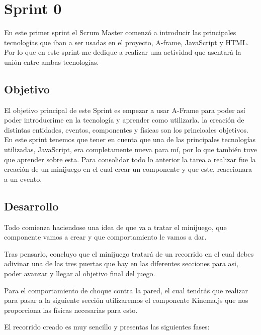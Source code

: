 \documentclass[a4paper, 12pt]{book}
\begin{document}
\section{Sprint 0} %
\label{sec:sprint0}
En este primer sprint el Scrum Master comenzó a introducir las principales tecnologías que iban a ser usadas en el proyecto, A-frame, JavaScript y HTML. Por lo que en este sprint me dedique a realizar una actividad que asentará la unión entre ambas tecnologías.

\subsection{Objetivo}
El objetivo principal de este Sprint es empezar a usar A-Frame para poder así poder introducrime en la tecnología y aprender como utilizarla. la creación de distintas entidades, eventos, componentes y físicas son los princioales objetivos. En este sprint tenemos que tener en cuenta que una de las principales tecnologías utilizadas, JavaScript, era completamente nueva para mí, por lo que también tuve que aprender sobre esta. Para consolidar todo lo anterior la tarea a realizar fue la creación de un minijuego en el cual crear un componente y que este, reaccionara a un evento.

\subsection{Desarrollo}
Todo comienza haciendose una idea de que va a tratar el minijuego, que componente vamos a crear y que comportamiento le vamos a dar.

Tras pensarlo, concluyo que el minijuego tratará de un recorrido en el cual debes adivinar una de las tres puertas que hay en las diferentes secciones para asi, poder avanzar y llegar al objetivo final del juego.

Para el comportamiento de choque contra la pared, el cual tendrás que realizar para pasar a la siguiente sección utilizaremos el componente Kinema.js que nos proporciona las físicas necesarias para esto. 

El recorrido creado es muy sencillo y presentas las siguientes fases:
\end{document}
